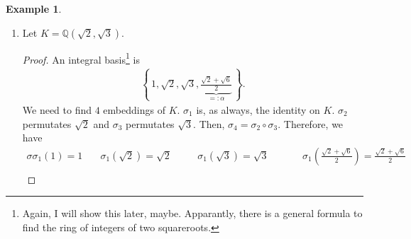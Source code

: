 \documentclass[a4paper]{book}
\theoremstyle{definition}
\newtheorem{example}{Example}[definition]
\newcommand{\set}[1]{\left\{\, #1 \,\right\}}
\begin{document}
\begin{example}
\begin{enumerate}
\begin{proof}
\begin{alignat*}
            &\quad \sigma_2(\zeta_3^2 \alpha) = \alpha && \quad \sigma_3(\zeta_3^2 \alpha) = \alpha
        \end{alignat*}
        or shorter, \(\sigma_1: \alpha \mapsto \alpha\), \(\sigma_2: \alpha \mapsto \zeta_3 \alpha\) and \(\sigma_3: \alpha \mapsto \zeta_3^2 \alpha\). Applying the embeddings on the integral basis yields
        \begin{alignat*}
            \sigma \sigma_1(1) = 1 & \quad \sigma_1(\alpha) = \alpha && \quad \sigma_1(\alpha^2) = \alpha^2 \\
            \sigma_2(1) = 1 & \quad \sigma_2(\alpha) = \zeta_3 \alpha && \quad \sigma_2(\alpha^2) = \sigma_2(\alpha) \sigma_2(\alpha) = \zeta_3^2 \alpha^2 \\
            \sigma_3(1) = 1 & \quad \sigma_3(\alpha) = \zeta_3^2 \alpha && \quad \sigma_3(\alpha^2) = \sigma_3(\alpha) \sigma_3(\alpha) = \zeta_3 \alpha^2 \text{.}
        \end{alignat*}
        Therefore, the discriminant is
        \begin{align*}
            \Delta_K = \left(\det \begin{pmatrix}
                1 & \alpha & \alpha^2 \\
                1 & \zeta_3 \alpha & \zeta_3^2 \alpha^2 \\
                1 & \zeta_3^2 \alpha & \zeta_3 \alpha^2
            \end{pmatrix}\right)^2
            = \left(-6 i \sqrt{3}\right)^2 = -108 \text{.}
        \end{align*}
    \end{proof}
    \item Let \(K = \mathbb{Q}(\sqrt{2}, \sqrt{3})\).
    \begin{proof}
        An integral basis\footnote{Again, I will show this later, maybe. Apparantly, there is a general formula to find the ring of integers of two squareroots.} is
        \begin{align*}
            \set{1, \sqrt{2}, \sqrt{3}, \underbrace{\frac{\sqrt{2} + \sqrt{6}}{2}}_{=: \alpha}} \text{.}
        \end{align*}
        We need to find \(4\) embeddings of \(K\). \(\sigma_1\) is, as always, the identity on \(K\). \(\sigma_2\) permutates \(\sqrt{2}\) and \(\sigma_3\) permutates \(\sqrt{3}\). Then, \(\sigma_4 = \sigma_2 \circ \sigma_3\). Therefore, we have
        \begin{alignat*}
            \sigma \sigma_1(1) = 1 & \quad \sigma_1(\sqrt{2}) = \sqrt{2} && \quad \sigma_1(\sqrt{3}) = \sqrt{3} &&& \quad \sigma_1 \left(\frac{\sqrt{2} + \sqrt{6}}{2}\right) = \frac{\sqrt{2} + \sqrt{6}}{2} \\

\end{alignat*}
\end{proof}
\end{enumerate}
\end{example}
\end{document}
